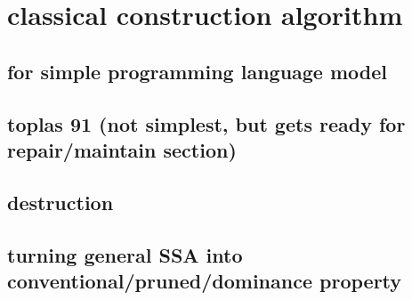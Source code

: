 \chapter*{classical construction algorithm}



\section{for simple programming language model}
\section{toplas 91 (not simplest, but gets ready for repair/maintain section)}
\section{destruction}
\section{turning general SSA into conventional/pruned/dominance property}


